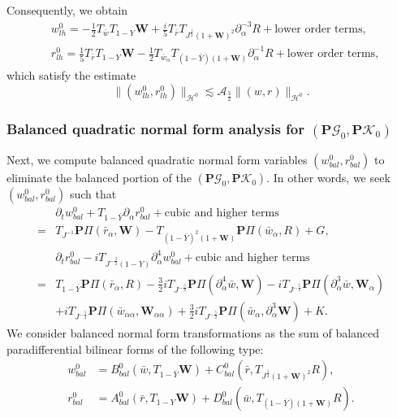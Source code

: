 \documentclass[10pt]{amsart}
\theoremstyle{remark}
\theoremstyle{definition}
\numberwithin{equation}{section}
\newcommand{\p}{\partial}
\renewcommand{\H}{{\mathcal H }}
\newcommand{\al}{\alpha}
\newcommand{\f}{\frac}
\newcommand{\bw}{\mathbf{W}}
\newcommand{\nP}{{\mathbf P}}
\begin{document}
Consequently, we obtain
\begin{align*}
    &w^0_{lh} = -\f12T_{\bar{w}}T_{1-Y}\bw +\f{i}{5} T_{\bar{r}}  T_{J^{\frac{1}{2}}(1+\bw)^2} \p_\al^{-3} R + \text{lower order terms},\\
    &r^0_{lh} = \f15 T_{\bar{r}}T_{1-Y}\bw -\f12T_{\bar{w}_{\al}}  T_{(1-\bar{Y})(1+\bw)}  \p^{-1}_{\al}R + \text{lower order terms},
\end{align*}
which satisfy the estimate
\begin{equation*}
    \|(w^0_{lh}, r^0_{lh})\|_{\H^0} \lesssim \mathcal{A}_{\f32}\|(w,r)\|_{\H^0}.
\end{equation*}


\subsubsection{Balanced quadratic normal form analysis for $(\nP\mathcal{G}_0, \nP\mathcal{K}_0)$} 
Next, we compute balanced quadratic normal form variables $(w^0_{bal}, r^0_{bal})$ to eliminate the balanced portion of the $(\nP\mathcal{G}_0, \nP\mathcal{K}_0)$.
In other words, we seek $(w^0_{bal}, r^0_{bal})$ such that
\begin{align*}
 &\p_tw^0_{bal}+T_{1-\bar{Y}}\p_\al r^0_{bal} + \text{cubic and higher terms}\\
 =&  T_{J^{-1}} \nP \Pi(\bar{r}_\alpha, \bw) -  T_{(1-\bar{Y})^2(1+\bw)} \nP \Pi(\bar{w}_\alpha, R)  + G,\\
&\p_tr^0_{bal}-iT_{J^{-\frac{3}{2}}(1-Y)}\p_\al^4w^0_{bal} + \text{cubic and higher terms}\\
=&  T_{1-\bar{Y}}\nP\Pi(\bar{r}_\alpha, R)-\f32 iT_{J^{-\f52}} \nP \Pi(\p^4_{\al}\bar{w},\bw) - iT_{J^{-\f52}} \nP \Pi(\p^3_{\al}\bar{w}, \bw_\al) \\
  &+ iT_{J^{-\f52}}\nP \Pi(\bar{w}_{\al\al},\bw_{\al\al})+ \f32 i T_{J^{-\f52}}\nP \Pi(\bar{w}_{\al},\p^3_{\al}\bw)+K.   
\end{align*}
We consider balanced normal form transformations as the sum of balanced paradifferential bilinear forms of the following type:
\begin{equation*} %
\begin{aligned}
w^0_{bal} &= B^0_{bal}\left(\bar{w}, T_{1-\bar{Y}}\bw \right) + C^0_{bal}\left(\bar{r}, T_{J^{\frac{1}{2}}(1+\bw)^2}R \right),\\
r^0_{bal} &= A^0_{bal} \left(\bar{r}, T_{1-Y}\bw \right) + D^0_{bal}\left(\bar{w}, T_{(1-\bar{Y})(1+\bw)}R\right).
\end{aligned}
\end{equation*}
\end{document}

